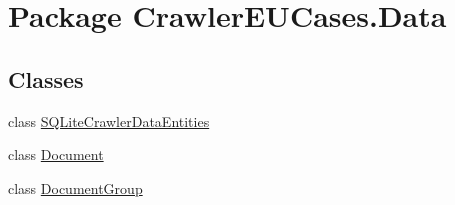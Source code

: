 \hypertarget{namespace_crawler_e_u_cases_1_1_data}{\section{Package Crawler\-E\-U\-Cases.\-Data}
\label{namespace_crawler_e_u_cases_1_1_data}
}
\subsection*{Classes}
\begin{DoxyCompactItemize}
\item 
class \hyperlink{class_crawler_e_u_cases_1_1_data_1_1_s_q_lite_crawler_data_entities}{S\-Q\-Lite\-Crawler\-Data\-Entities}
\item 
class \hyperlink{class_crawler_e_u_cases_1_1_data_1_1_document}{Document}
\item 
class \hyperlink{class_crawler_e_u_cases_1_1_data_1_1_document_group}{Document\-Group}
\end{DoxyCompactItemize}

